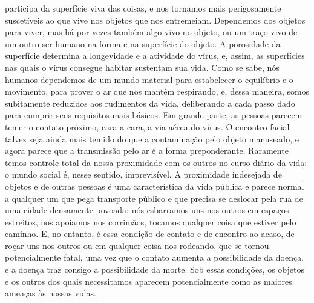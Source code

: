 participa da superfície viva das coisas, e nos tornamos mais
perigosamente suscetíveis ao que vive nos objetos que nos entremeiam.
Dependemos dos objetos para viver, mas há por vezes também algo vivo no
objeto, ou um traço vivo de um outro ser humano na forma e na superfície
do objeto. A porosidade da superfície determina a longevidade e a
atividade do vírus, e, assim, as superfícies nas quais o vírus consegue
habitar sustentam sua vida. Como se sabe, nós humanos dependemos de um
mundo material para estabelecer o equilíbrio e o movimento, para prover
o ar que nos mantém respirando, e, dessa maneira, somos subitamente
reduzidos aos rudimentos da vida, deliberando a cada passo dado para
cumprir seus requisitos mais básicos. Em grande parte, as pessoas
parecem temer o contato próximo, cara a cara, a via aérea do vírus. O
encontro facial talvez seja ainda mais temido do que a contaminação pelo
objeto manuseado, e agora parece que a transmissão pelo ar é a forma
preponderante. Raramente temos controle total da nossa proximidade com
os outros no curso diário da vida: o mundo social é, nesse sentido,
imprevisível. A proximidade indesejada de objetos e de outras pessoas é
uma característica da vida pública e parece normal a qualquer um que
pega transporte público e que precisa se deslocar pela rua de uma cidade
densamente povoada: nós esbarramos uns nos outros em espaços estreitos,
nos apoiamos nos corrimãos, tocamos qualquer coisa que estiver pelo
caminho. E, no entanto, é essa condição de contato e de encontro ao
acaso, de roçar uns nos outros ou em qualquer coisa nos rodeando, que se
tornou potencialmente fatal, uma vez que o contato aumenta a
possibilidade da doença, e a doença traz consigo a possibilidade da
morte. Sob essas condições, os objetos e os outros dos quais
necessitamos aparecem potencialmente como as maiores ameaças às nossas
vidas.

